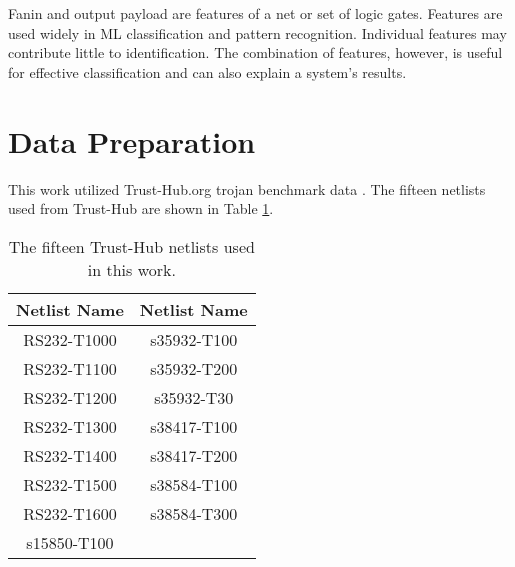 Fanin and output payload are features of a net or set of logic gates. Features
are used widely in ML classification and pattern recognition. Individual
features may contribute little to identification. The combination of features,
however, is useful for effective classification and can also explain a system's
results.

\section{Data Preparation} \label{trojan_data_prep}

This work utilized Trust-Hub.org trojan benchmark data \cite{6657085,
shakya2017benchmarking, px6s-sm21-22, slayback2015computer}.  The fifteen
netlists used from Trust-Hub are shown in Table \ref{tab:netlists_used}.

\begin{table}[h]
    \renewcommand{\arraystretch}{1.3}
    \caption{The fifteen Trust-Hub netlists used in this work.}
    \begin{center}
    \begin{tabular}{|c||c|}
        \hline
        \bfseries Netlist Name & \bfseries Netlist Name \\
        \hline
        \hline
        RS232-T1000 & s35932-T100 \\
        \hline
        RS232-T1100 & s35932-T200 \\
        \hline
        RS232-T1200 & s35932-T30 \\
        \hline
        RS232-T1300 & s38417-T100 \\
        \hline
        RS232-T1400 & s38417-T200 \\
        \hline
        RS232-T1500 & s38584-T100 \\
        \hline
        RS232-T1600 & s38584-T300 \\
        \hline
        s15850-T100  \\
        \cline{0-0}
    \end{tabular}
    \end{center}
    \label{tab:netlists_used}
\end{table}

